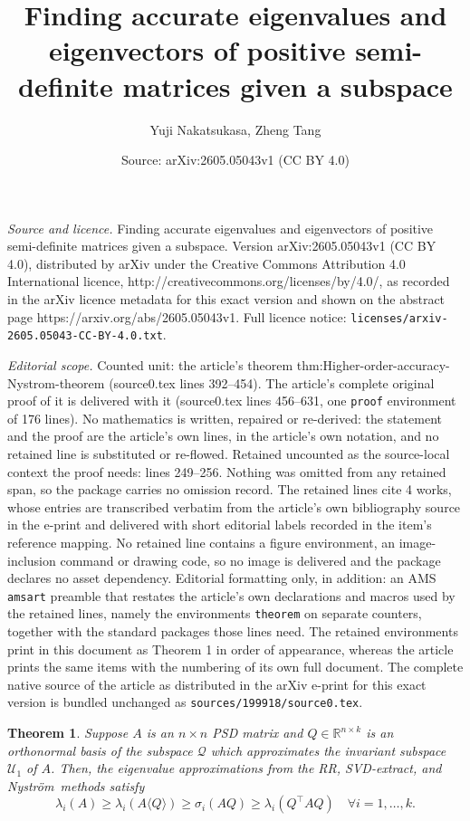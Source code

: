 \documentclass[10pt,a4paper]{amsart}
\title{Finding accurate eigenvalues and eigenvectors of positive semi-definite matrices given a subspace}
\author{Yuji Nakatsukasa, Zheng Tang}
\date{Source: arXiv:2605.05043v1 (CC BY 4.0)}
\newtheorem{theorem}{Theorem}
\def\Nystrom{Nystr{\"o}m}
\def\leadingsubspace{\mathcal{U}_1}
\def\subspace{\mathcal{Q}}
\def\svdmethod{SVD-extract}
\begin{document}
\maketitle

\noindent\emph{Source and licence.} Finding accurate eigenvalues and eigenvectors of positive semi-definite matrices given a subspace. Version arXiv:2605.05043v1 (CC BY 4.0), distributed by arXiv under the Creative Commons Attribution 4.0 International licence, http://creativecommons.org/licenses/by/4.0/, as recorded in the arXiv licence metadata for this exact version and shown on the abstract page https://arxiv.org/abs/2605.05043v1. Full licence notice: \texttt{licenses/arxiv-2605.05043-CC-BY-4.0.txt}.\par\smallskip

\noindent\textit{Editorial scope.} Counted unit: the article's theorem thm:Higher-order-accuracy-Nystrom-theorem (source0.tex lines 392--454). The article's complete original proof of it is delivered with it (source0.tex lines 456--631, one \texttt{proof} environment of 176 lines). No mathematics is written, repaired or re-derived: the statement and the proof are the article's own lines, in the article's own notation, and no retained line is substituted or re-flowed.  Retained uncounted as the source-local context the proof needs: lines 249--256.  Nothing was omitted from any retained span, so the package carries no omission record.  The retained lines cite 4 works, whose entries are transcribed verbatim from the article's own bibliography source in the e-print and delivered with short editorial labels recorded in the item's reference mapping.  No retained line contains a figure environment, an image-inclusion command or drawing code, so no image is delivered and the package declares no asset dependency.  Editorial formatting only, in addition: an AMS \texttt{amsart} preamble that restates the article's own declarations and macros used by the retained lines, namely the environments \texttt{theorem} on separate counters, together with the standard packages those lines need.  The retained environments print in this document as Theorem 1 in order of appearance, whereas the article prints the same items with the numbering of its own full document.  The complete native source of the article as distributed in the arXiv e-print for this exact version is bundled unchanged as \texttt{sources/199918/source0.tex}.
\begin{theorem}
    \label{thm:Nystom-vs-SVD-vs-RR-Theorem}
    Suppose $A$ is an $n \times n$ PSD matrix and $Q\in\mathbb{R}^{n\times k}$ is an orthonormal basis of the subspace $\subspace$ which approximates the invariant subspace $\leadingsubspace$ of $A$. Then, the eigenvalue approximations from the RR, \svdmethod, and \Nystrom\ methods satisfy  
    \begin{equation}
        \label{eq:Nystrom-vs-SVD-vs-RR}
        \lambda_i(A) \geq \lambda_i(A\langle Q \rangle) \geq \sigma_i(AQ) \geq \lambda_i(Q^\top A Q) \quad \forall i = 1,\ldots, k.
    \end{equation}
\end{theorem}
\end{document}
